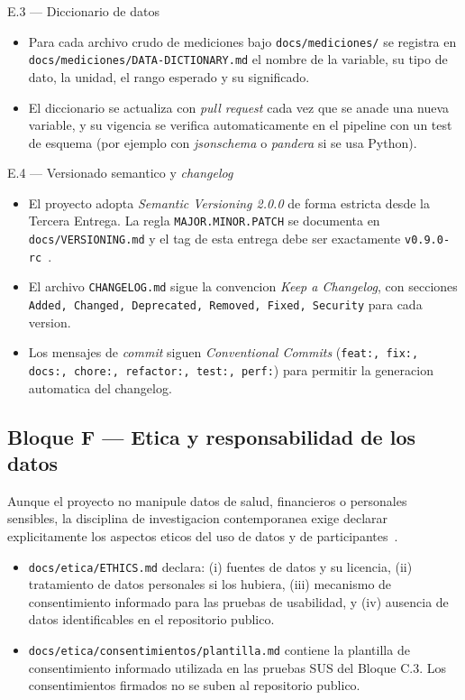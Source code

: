 \documentclass[11pt,a4paper]{article}
\begin{document}
\begin{cajaentregable}{E.3 --- Diccionario de datos}
    \begin{itemize}
        \item Para cada archivo crudo de mediciones bajo \texttt{docs/mediciones/} se registra en \texttt{docs/mediciones/DATA-DICTIONARY.md} el nombre de la variable, su tipo de dato, la unidad, el rango esperado y su significado.
        \item El diccionario se actualiza con \emph{pull request} cada vez que se anade una nueva variable, y su vigencia se verifica automaticamente en el pipeline con un test de esquema (por ejemplo con \emph{jsonschema} o \emph{pandera} si se usa Python).
    \end{itemize}
\end{cajaentregable}

\begin{cajaentregable}{E.4 --- Versionado semantico y \emph{changelog}}
    \begin{itemize}
        \item El proyecto adopta \emph{Semantic Versioning 2.0.0} de forma estricta desde la Tercera Entrega. La regla \texttt{MAJOR.MINOR.PATCH} se documenta en \texttt{docs/VERSIONING.md} y el tag de esta entrega debe ser exactamente \texttt{v0.9.0-rc}~\cite{prestonwerner2013semver}.
        \item El archivo \texttt{CHANGELOG.md} sigue la convencion \emph{Keep a Changelog}, con secciones \texttt{Added, Changed, Deprecated, Removed, Fixed, Security} para cada version.
        \item Los mensajes de \emph{commit} siguen \emph{Conventional Commits} (\texttt{feat:, fix:, docs:, chore:, refactor:, test:, perf:}) para permitir la generacion automatica del changelog.
    \end{itemize}
\end{cajaentregable}

\subsection{Bloque F --- Etica y responsabilidad de los datos}

Aunque el proyecto no manipule datos de salud, financieros o personales sensibles, la disciplina de investigacion contemporanea exige declarar explicitamente los aspectos eticos del uso de datos y de participantes~\cite{washizaki2024swebok,wohlin2012experimentation}.

\begin{itemize}
    \item \texttt{docs/etica/ETHICS.md} declara: (i) fuentes de datos y su licencia, (ii) tratamiento de datos personales si los hubiera, (iii) mecanismo de consentimiento informado para las pruebas de usabilidad, y (iv) ausencia de datos identificables en el repositorio publico.
    \item \texttt{docs/etica/consentimientos/plantilla.md} contiene la plantilla de consentimiento informado utilizada en las pruebas SUS del Bloque C.3. Los consentimientos firmados no se suben al repositorio publico.
\end{itemize}
\end{document}
